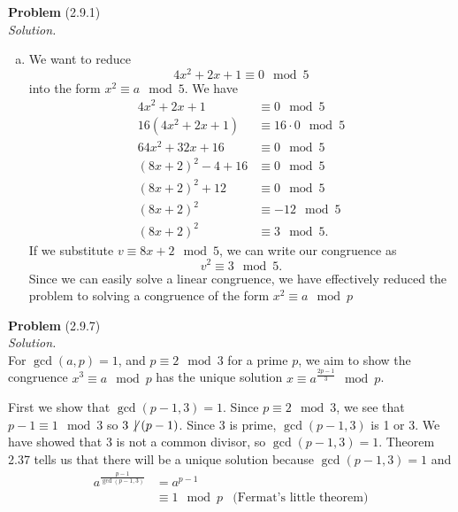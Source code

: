 \documentclass[12 pt]{amsart}
\begin{document}
\phantom{\quad} \vfill
\noindent
\textbf{Problem} (2.9.1) \\[4ex]
\emph{Solution.} \\[2ex]
  \begin{enumerate}[a.]
    \item
      We want to reduce 
      \[
        4x^2 + 2x + 1 \equiv 0 \mod 5
      \]
      into the form $x^2 \equiv a \mod 5$.
      We have 
      \begin{align*}
        4x^2 + 2x + 1 &\equiv 0 \mod 5 \\
        16(4x^2 + 2x + 1) &\equiv 16 \cdot 0 \mod 5 \\
        64x^2 + 32x + 16 &\equiv 0 \mod 5 \\
        ( 8x + 2)^2 - 4 +  16 &\equiv 0 \mod 5 \\
        ( 8x + 2)^2 + 12 &\equiv 0 \mod 5 \\
        ( 8x + 2)^2  &\equiv -12 \mod 5 \\
        ( 8x + 2)^2  &\equiv 3 \mod 5.
      \end{align*}
      If we substitute $v \equiv 8x + 2 \mod 5$, 
      we can write our congruence as
      \[
        v^2 \equiv 3 \mod 5.
      \]
      Since we can easily solve a linear congruence,
      we have effectively reduced the problem
      to solving a congruence of the form 
      $x^2 \equiv a \mod p$
  \end{enumerate}
\vfill
\newpage



\phantom{\quad} \vfill
\noindent
\textbf{Problem} (2.9.7) \\[4ex]
\emph{Solution.} \\[2ex]
  For $\gcd(a, p) = 1$, and $p \equiv 2 \mod 3$ for a prime $p$, 
  we aim to show the congruence $x^3 \equiv a \mod p$ has the unique solution 
  $x \equiv a^{\frac{2p-1}{3}} \mod p$.

  First we show that $\gcd(p-1, 3) = 1$. 
  Since $p \equiv 2 \mod 3$, we see that $p-1 \equiv 1 \mod 3$ so
  $3 \not \, \mid (p-1)$.
  Since 3 is prime, $\gcd(p-1, 3)$ is 1 or 3. 
  We have showed that 3 is not a common divisor, so 
  $\gcd(p-1, 3) = 1$. 
  Theorem 2.37 tells us that there will be a unique solution 
  because $\gcd(p-1, 3) = 1$ and 
  \begin{align*}
    a^{\frac{p-1}{\gcd(p-1,3)}} &= a^{p-1} \\
                                &\equiv 1 \mod p & \text{(Fermat's little theorem)}
  \end{align*}
\end{document}
